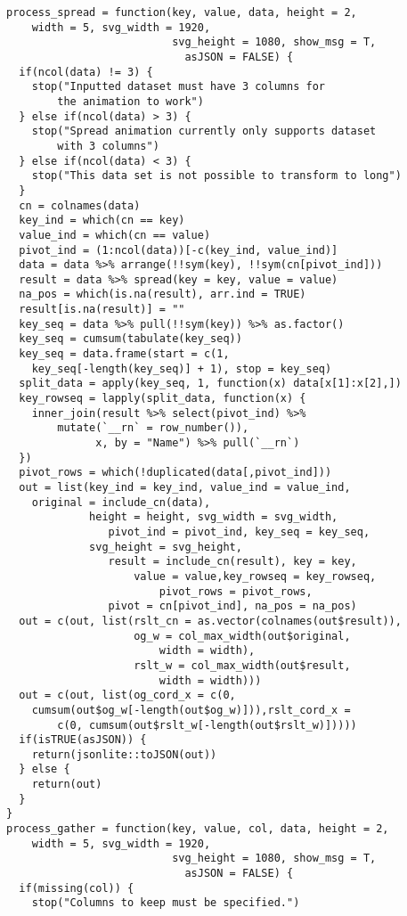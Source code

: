 \begin{lstlisting}
process_spread = function(key, value, data, height = 2, 
    width = 5, svg_width = 1920,
                          svg_height = 1080, show_msg = T, 
                            asJSON = FALSE) {
  if(ncol(data) != 3) {
    stop("Inputted dataset must have 3 columns for 
        the animation to work")
  } else if(ncol(data) > 3) {
    stop("Spread animation currently only supports dataset 
        with 3 columns")
  } else if(ncol(data) < 3) {
    stop("This data set is not possible to transform to long")
  }
  cn = colnames(data)
  key_ind = which(cn == key)
  value_ind = which(cn == value)
  pivot_ind = (1:ncol(data))[-c(key_ind, value_ind)]
  data = data %>% arrange(!!sym(key), !!sym(cn[pivot_ind]))
  result = data %>% spread(key = key, value = value)
  na_pos = which(is.na(result), arr.ind = TRUE)
  result[is.na(result)] = ""
  key_seq = data %>% pull(!!sym(key)) %>% as.factor()
  key_seq = cumsum(tabulate(key_seq))
  key_seq = data.frame(start = c(1, 
    key_seq[-length(key_seq)] + 1), stop = key_seq)
  split_data = apply(key_seq, 1, function(x) data[x[1]:x[2],])
  key_rowseq = lapply(split_data, function(x) {
    inner_join(result %>% select(pivot_ind) %>% 
        mutate(`__rn` = row_number()),
              x, by = "Name") %>% pull(`__rn`)
  })
  pivot_rows = which(!duplicated(data[,pivot_ind]))
  out = list(key_ind = key_ind, value_ind = value_ind, 
    original = include_cn(data),
             height = height, svg_width = svg_width, 
                pivot_ind = pivot_ind, key_seq = key_seq,
             svg_height = svg_height, 
                result = include_cn(result), key = key, 
                    value = value,key_rowseq = key_rowseq, 
                        pivot_rows = pivot_rows, 
                pivot = cn[pivot_ind], na_pos = na_pos)
  out = c(out, list(rslt_cn = as.vector(colnames(out$result)),
                    og_w = col_max_width(out$original, 
                        width = width),
                    rslt_w = col_max_width(out$result, 
                        width = width)))
  out = c(out, list(og_cord_x = c(0, 
    cumsum(out$og_w[-length(out$og_w)])),rslt_cord_x = 
        c(0, cumsum(out$rslt_w[-length(out$rslt_w)]))))
  if(isTRUE(asJSON)) {
    return(jsonlite::toJSON(out))
  } else {
    return(out)
  }
}
process_gather = function(key, value, col, data, height = 2, 
    width = 5, svg_width = 1920,
                          svg_height = 1080, show_msg = T, 
                            asJSON = FALSE) {
  if(missing(col)) {
    stop("Columns to keep must be specified.")

\end{lstlisting}
